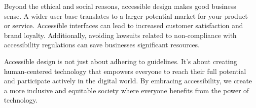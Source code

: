 Beyond the ethical and social reasons, accessible design makes good business
sense.  A wider user base translates to a larger potential market for your
product or service. Accessible interfaces can lead to increased customer
satisfaction and brand loyalty. Additionally, avoiding lawsuits related to
non-compliance with accessibility regulations can save businesses significant
resources.

Accessible design is not just about adhering to guidelines. It's about creating
human-centered technology that empowers everyone to reach their full potential
and participate actively in the digital world. By embracing accessibility, we
create a more inclusive and equitable society where everyone benefits from the
power of technology.

